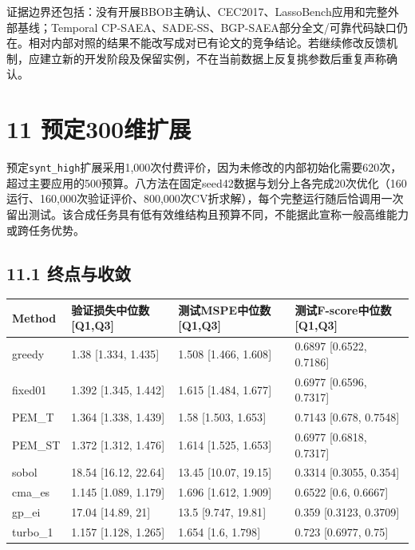 \documentclass[11pt,a4paper]{article}
\begin{document}
证据边界还包括：没有开展BBOB主确认、CEC2017、LassoBench应用和完整外部基线；Temporal
CP-SAEA、SADE-SS、BGP-SAEA部分全文/可靠代码缺口仍在。相对内部对照的结果不能改写成对已有论文的竞争结论。若继续修改反馈机制，应建立新的开发阶段及保留实例，不在当前数据上反复挑参数后重复声称确认。

\hypertarget{ux9884ux5b9a300ux7ef4ux6269ux5c55}{%
\section{11 预定300维扩展}\label{ux9884ux5b9a300ux7ef4ux6269ux5c55}}

预定\texttt{synt\_high}扩展采用1,000次付费评价，因为未修改的内部初始化需要620次，超过主要应用的500预算。八方法在固定seed42数据与划分上各完成20次优化（160运行、160,000次验证评价、800,000次CV折求解），每个完整运行随后恰调用一次留出测试。该合成任务具有低有效维结构且预算不同，不能据此宣称一般高维能力或跨任务优势。

\hypertarget{ux7ec8ux70b9ux4e0eux6536ux655b}{%
\subsection{11.1 终点与收敛}\label{ux7ec8ux70b9ux4e0eux6536ux655b}}

\par\noindent\begin{minipage}{\linewidth}

\begin{longtable}[]{@{}llll@{}}
\toprule
Method & 验证损失中位数{[}Q1,Q3{]} & 测试MSPE中位数{[}Q1,Q3{]} &
测试F-score中位数{[}Q1,Q3{]} \\
\midrule
\endhead
greedy & 1.38 {[}1.334, 1.435{]} & 1.508 {[}1.466, 1.608{]} & 0.6897
{[}0.6522, 0.7186{]} \\
fixed01 & 1.392 {[}1.345, 1.442{]} & 1.615 {[}1.484, 1.677{]} & 0.6977
{[}0.6596, 0.7317{]} \\
PEM\_T & 1.364 {[}1.338, 1.439{]} & 1.58 {[}1.503, 1.653{]} & 0.7143
{[}0.678, 0.7548{]} \\
PEM\_ST & 1.372 {[}1.312, 1.476{]} & 1.614 {[}1.525, 1.653{]} & 0.6977
{[}0.6818, 0.7317{]} \\
sobol & 18.54 {[}16.12, 22.64{]} & 13.45 {[}10.07, 19.15{]} & 0.3314
{[}0.3055, 0.354{]} \\
cma\_es & 1.145 {[}1.089, 1.179{]} & 1.696 {[}1.612, 1.909{]} & 0.6522
{[}0.6, 0.6667{]} \\
gp\_ei & 17.04 {[}14.89, 21{]} & 13.5 {[}9.747, 19.81{]} & 0.359
{[}0.3123, 0.3709{]} \\
turbo\_1 & 1.157 {[}1.128, 1.265{]} & 1.654 {[}1.6, 1.798{]} & 0.723
{[}0.6977, 0.75{]} \\
\bottomrule
\end{longtable}

\end{minipage}\par
\end{document}
